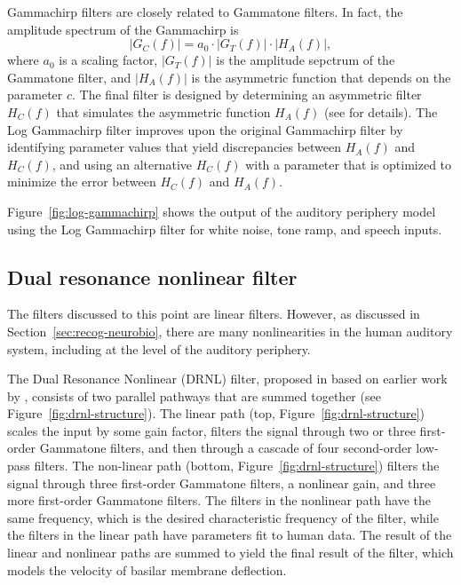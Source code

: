 Gammachirp filters are closely related
to Gammatone filters.
In fact, the amplitude spectrum of the Gammachirp is
\begin{equation}
  |G_C(f)| = a_0 \cdot |G_T(f)| \cdot |H_A(f)|,
\end{equation}
where $a_0$ is a scaling factor,
$|G_T(f)|$ is the amplitude sepctrum
of the Gammatone filter,
and $|H_A(f)|$ is the asymmetric function
that depends on the parameter $c$.
The final filter
is designed by determining
an asymmetric filter $H_C(f)$
that simulates the
asymmetric function $H_A(f)$
(see \citealt{unoki2001} for details).
The Log Gammachirp filter improves upon
the original Gammachirp filter
by identifying parameter values
that yield discrepancies
between $H_A(f)$ and $H_C(f)$,
and using an alternative $H_C(f)$
with a parameter that is optimized
to minimize the error between
$H_C(f)$ and $H_A(f)$.

Figure~\ref{fig:log-gammachirp} shows the output
of the auditory periphery model
using the Log Gammachirp filter
for white noise, tone ramp, and speech inputs.


\subsection{Dual resonance nonlinear filter}

The filters discussed to this point
are linear filters.
However, as discussed in
Section~\ref{sec:recog-neurobio},
there are many nonlinearities
in the human auditory system,
including at the level of the auditory periphery.

The Dual Resonance Nonlinear (DRNL) filter,
proposed in \citet{lopez2001}
based on earlier work by \citet{meddis2001},
consists of two parallel pathways
that are summed together
(see Figure~\ref{fig:drnl-structure}).
The linear path (top, Figure~\ref{fig:drnl-structure})
scales the input by some gain factor,
filters the signal through
two or three first-order Gammatone filters,
and then through a cascade of
four second-order low-pass filters.
The non-linear path (bottom, Figure~\ref{fig:drnl-structure})
filters the signal through
three first-order Gammatone filters,
a nonlinear gain,
and three more first-order Gammatone filters.
The filters in the nonlinear path
have the same frequency,
which is the desired characteristic frequency
of the filter,
while the filters in the linear path
have parameters fit to human data.
The result of the linear and nonlinear paths
are summed to yield
the final result of the filter,
which models the velocity of
basilar membrane deflection.

